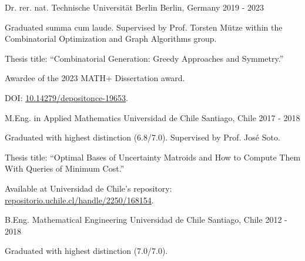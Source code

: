 

\begin{cventries}

  \cventry
    {Dr. rer. nat.} %
    {Technische Universität Berlin} %
    {Berlin, Germany} %
    {2019 - 2023} %
    {%
    \begin{cvitems}
      \item Graduated summa cum laude.
      Supervised by Prof. Torsten Mütze within the Combinatorial Optimization and Graph Algorithms group.
      \item[] Thesis title: ``Combinatorial Generation: Greedy Approaches and Symmetry.''
      \item[] Awardee of the 2023 MATH+ Dissertation award.
      \item[] DOI: \href{https://doi.org/10.14279/depositonce-19653}{10.14279/depositonce-19653}.
    \end{cvitems}
}
  
  \cventry
    {M.Eng. in Applied Mathematics} %
    {Universidad de Chile} %
    {Santiago, Chile} %
    {2017 - 2018} %
    {
      \begin{cvitems}
      \item Graduated with highest distinction (6.8/7.0). Supervised by Prof. José Soto. 
      \item[] Thesis title: ``Optimal Bases of Uncertainty Matroids and How to Compute Them With Queries of Minimum Cost.''
      \item[] Available at Universidad de Chile's repository: \href{https://repositorio.uchile.cl/handle/2250/168154}{repositorio.uchile.cl/handle/2250/168154}.
      \end{cvitems}
    }
  
  \cventry
    {B.Eng. Mathematical Engineering} %
    {Universidad de Chile} %
    {Santiago, Chile} %
    {2012 - 2018} %
    {
      \begin{cvitems}
        \item Graduated with highest distinction (7.0/7.0). 
      \end{cvitems}
    }
\end{cventries}
